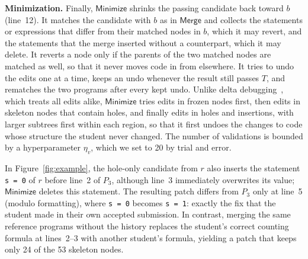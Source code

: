 \documentclass[10pt,conference]{IEEEtran}
\begin{document}
\textbf{Minimization.} Finally, $\mathsf{Minimize}$ shrinks the passing candidate back toward $b$ (line~12). It matches the candidate with $b$ as in $\mathsf{Merge}$ and collects the statements or expressions that differ from their matched nodes in $b$, which it may revert, and the statements that the merge inserted without a counterpart, which it may delete. It reverts a node only if the parents of the two matched nodes are matched as well, so that it never moves code in from elsewhere. It tries to undo the edits one at a time, keeps an undo whenever the result still passes $T$, and rematches the two programs after every kept undo. Unlike delta debugging~\cite{zeller2002simplifying}, which treats all edits alike, $\mathsf{Minimize}$ tries edits in frozen nodes first, then edits in skeleton nodes that contain holes, and finally edits in holes and insertions, with larger subtrees first within each region, so that it first undoes the changes to code whose structure the student never changed. The number of validations is bounded by a hyperparameter $\eta_v$, which we set to 20 by trial and error.

In Figure~\ref{fig:example}, the hole-only candidate from $r$ also inserts the statement \texttt{s = 0} of $r$ before line~2 of $P_3$, although line~3 immediately overwrites its value; $\mathsf{Minimize}$ deletes this statement. The resulting patch differs from $P_3$ only at line~5 (modulo formatting), where \texttt{s = 0} becomes \texttt{s = 1}: exactly the fix that the student made in their own accepted submission. In contrast, merging the same reference programs without the history replaces the student's correct counting formula at lines~2--3 with another student's formula, yielding a patch that keeps only 24 of the 53 skeleton nodes.
\end{document}
